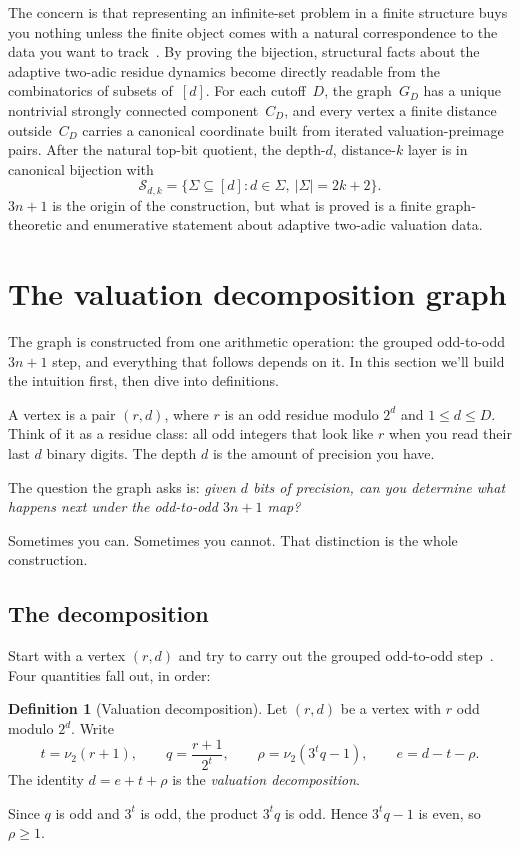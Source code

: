 \documentclass[11pt]{amsart}
\theoremstyle{definition}
\newtheorem{definition}[theorem]{Definition}
\theoremstyle{remark}
\newcommand{\nuu}{\nu_2}
\newcommand{\Sfam}{\mathcal S}
\begin{document}
The concern is that representing an infinite-set problem in a finite structure 
buys you nothing unless the finite object comes with a natural correspondence 
to the data you want to track~\cite{Stanley2012, FlajoletSedgewick2009}.  By 
proving the bijection, structural facts about the adaptive two-adic residue 
dynamics become directly readable from the combinatorics of subsets of~$[d]$.  
For each cutoff~$D$, the graph~$G_D$ has a unique nontrivial strongly connected
component~$C_D$, and every vertex a finite distance outside~$C_D$ carries a 
canonical coordinate built from iterated valuation-preimage pairs.  After the 
natural top-bit quotient, the depth-$d$, distance-$k$ layer is in canonical bijection 
with
\[
\Sfam_{d,k}=\{\Sigma\subseteq[d]:d\in\Sigma,\ |\Sigma|=2k+2\}.
\]
$3n+1$ is the origin of the construction, but what is proved is a finite
graph-theoretic and enumerative statement about adaptive two-adic valuation
data.

\section{The valuation decomposition graph}\label{sec:valuation}\label{sec:graph}
The graph is constructed from one arithmetic operation: the grouped odd-to-odd $3n+1$ step, and everything that follows depends on it. In this section we'll build the intuition first, then dive into definitions.

A vertex is a pair $(r,d)$, where $r$ is an odd residue modulo $2^d$ and $1\le d\le D$.  Think of it as a residue class: all odd integers that look like $r$ when you read their last $d$ binary digits.  The depth $d$ is the amount of precision you have.

The question the graph asks is: \emph{given $d$ bits of precision, can you determine what happens next under the odd-to-odd $3n+1$ map?}

Sometimes you can.  Sometimes you cannot.  That distinction is the whole construction.

\subsection{The decomposition}
Start with a vertex $(r,d)$ and try to carry out the grouped odd-to-odd step~\cite{Wirsching1998}.  Four quantities fall out, in order:

\begin{definition}[Valuation decomposition]\label{def:valuation}
Let $(r,d)$ be a vertex with $r$ odd modulo $2^d$.  Write
\[
t=\nuu(r+1),\qquad q=\frac{r+1}{2^t},\qquad
\rho=\nuu(3^tq-1),\qquad e=d-t-\rho.
\]
The identity $d=e+t+\rho$ is the \emph{valuation decomposition}.

Since \(q\) is odd and \(3^t\) is odd, the product \(3^tq\) is odd. Hence \(3^tq-1\) is even, so \(\rho\ge1\).
\end{definition}
\end{document}
